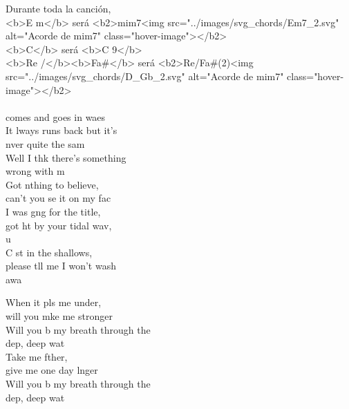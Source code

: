 \begin{cancion}%
	\jump
Durante toda la canción, \\
<b>E m</b> será <b2>mim7<img src="../images/svg_chords/Em7_2.svg" alt="Acorde de mim7" class="hover-image"></b2>\\
<b>C</b>  será <b>C 9</b>\\
<b>Re /</b><b>Fa#</b> será <b2>Re/Fa#(2)<img src="../images/svg_chords/D_Gb_2.svg" alt="Acorde de mim7" class="hover-image"></b2>\\
	\jump
	\jump
	           \\
	 comes and goes in waes\\
	It lways runs back but it's \\
	nver quite the sam\\
	Well I thk there's something \\
	wrong with m\\
	Got nthing to believe, \\
	can't you se it on my fac\\
	\jump
	I was gng for the title, \\
	got ht by your tidal wav, \\
	u\\
	C st in the shallows, \\
	please tll me I won't wash\\
	 awa  \jump\\
	\begin{chorus}%
		When it pls me under, \\
		will you mke me stronger\\
		Will you b my breath through the \\
		dep, deep wat\\
		Take me fther, \\
		give me one day lnger\\
		Will you b my breath through the \\
		dep, deep wat\\

\end{chorus}
\end{cancion}
